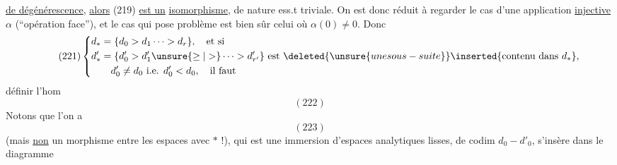 \uline{de dégénérescence}, \uline{alors} (219) \uline{est un}
\uline{isomorphisme}, de nature ess.t triviale.
On est donc réduit à regarder le
cas d'une application \uline{injective} $\alpha$ (``opération
face''), et le  cas qui  pose problème
est bien sûr celui où $\alpha(0)\ne0$. Donc
\[
\tag{221}
\left\{\begin{aligned}
d_*&=\{d_0>d_1\cdots>d_r\},\quad\text{et si}\\
d'_*&=\{d'_0>d'_1\unsure{\geq|>}\cdots>d'_{r'}\}\text{ est }
\deleted{\unsure{une sous-suite}}\inserted{\text{contenu dans }d_*},\\
&\quad d'_0\ne d_0\text{ i.e. }d'_0<d_0,\quad\text{il faut}
\end{aligned}\right.
\]
définir l'hom
\[
(222)
\]
Notons que l'on a
\[
(223)
\]
(mais \uline{non} un morphisme entre les
espaces avec $*$ !), qui est une immersion 
d'espaces analytiques lisses, de codim
$d_0-d'_0$,  s'insère dans le diagramme
